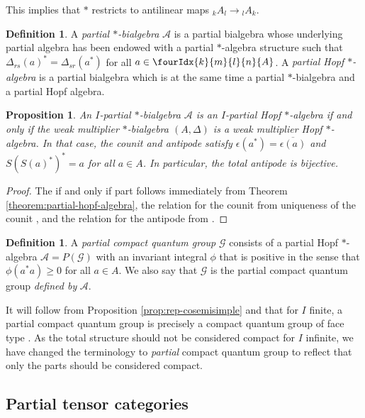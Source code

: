 \documentclass[10pt]{article}
\newcommand{\GrDA}[3]{{}_{#2}#1_{#3}} %
\newcommand{\Gr}[5]{\fourIdx{#2}{#4}{#3}{#5}{#1}}%
\newtheorem{Prop}[Theorem]{Proposition}
\theoremstyle{definition}
\newtheorem{Def}[Theorem]{Definition}
\numberwithin{equation}{section}
\begin{document}
This implies that $*$ restricts to antilinear maps $\GrDA{A}{k}{l}\rightarrow \GrDA{A}{l}{k}$.

\begin{Def} A \emph{partial $*$-bialgebra} $\mathscr{A}$ is a
 partial bialgebra whose underlying partial algebra has been
  endowed with a partial $*$-algebra structure such that
$\Delta_{rs}(a)^* = \Delta_{sr}(a^*)$ for all $a \in \Gr{A}{k}{l}{m}{n}$.
A \emph{partial Hopf $*$-algebra} is a partial bialgebra which is at the same time a partial $*$-bialgebra and a partial Hopf algebra.
\end{Def} 

\begin{Prop} \label{cor:involutive}
  An $I$-partial $*$-bialgebra $\mathscr{A}$ is an $I$-partial Hopf
  $*$-algebra if and only if the weak multiplier $*$-bialgebra
  $(A,\Delta)$ is a weak multiplier Hopf $*$-algebra. In that case,
  the counit and antipode satisfy
  $\epsilon(a^{*})=\overline{\epsilon(a)}$ and $S(S(a)^{*})^{*}=a$ for
  all $a\in A$. In particular, the total antipode is bijective.
\end{Prop}
\begin{proof}
  The if and only if part follows immediately from  Theorem
  \ref{theorem:partial-hopf-algebra}, the relation for the counit  from
uniqueness of the counit  \cite[Theorem 2.8]{Boh1}, and the relation
for the antipode from \cite[Proposition 4.11]{VDW1}.
\end{proof}

\begin{Def}\label{DefPCQG} A \emph{partial compact quantum group} $\mathscr{G}$ consists of a
  partial Hopf $*$-algebra $\mathscr{A} = P(\mathscr{G})$ with an invariant integral  $\phi$ that is positive in the sense  that $\phi(a^*a)\geq 0$ for all $a\in A$. We also say that $\mathscr{G}$ is the partial compact quantum group \emph{defined by} $\mathscr{A}$.
\end{Def} 

It will follow from Proposition \ref{prop:rep-cosemisimple} and  \cite[Theorem 3.3 and Theorem 4.4]{Hay1} that for $I$ finite, a partial compact quantum group is precisely a compact quantum group of face type \cite[Definition 4.1]{Hay1}. As the total structure should not be considered compact for $I$ infinite, we have changed the terminology to \emph{partial} compact quantum group to reflect that only the parts should be considered compact.

\subsection{Partial tensor categories}\label{SecPartTen}
\end{document}
